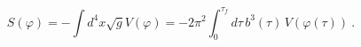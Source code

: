 \begin{equation}\label{dsaction}
S(\varphi) = -\int d^4x
\sqrt{g} V(\varphi) = - {2\pi^2\int_0^{\tau_f} d\tau\, b^3(\tau)\, V(\varphi(\tau))}\ .
\end{equation}

